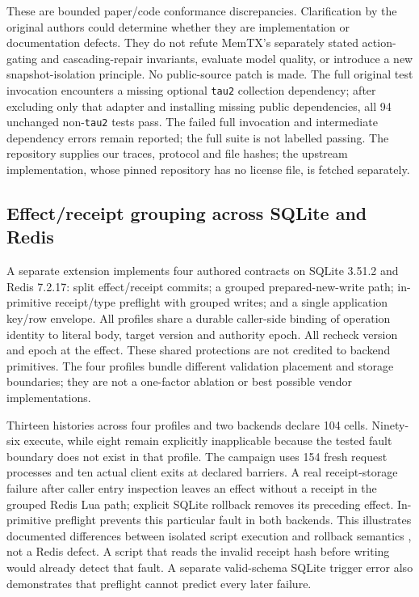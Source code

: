 These are bounded paper/code conformance discrepancies. Clarification by the original authors could determine whether they are implementation or documentation defects. They do not refute MemTX's separately stated action-gating and cascading-repair invariants, evaluate model quality, or introduce a new snapshot-isolation principle. No public-source patch is made. The full original test invocation encounters a missing optional \texttt{tau2} collection dependency; after excluding only that adapter and installing missing public dependencies, all 94 unchanged non-\texttt{tau2} tests pass. The failed full invocation and intermediate dependency errors remain reported; the full suite is not labelled passing. The repository supplies our traces, protocol and file hashes; the upstream implementation, whose pinned repository has no license file, is fetched separately.

\subsection{Effect/receipt grouping across SQLite and Redis}
A separate extension implements four authored contracts on SQLite 3.51.2 and Redis 7.2.17: split effect/receipt commits; a grouped prepared-new-write path; in-primitive receipt/type preflight with grouped writes; and a single application key/row envelope. All profiles share a durable caller-side binding of operation identity to literal body, target version and authority epoch. All recheck version and epoch at the effect. These shared protections are not credited to backend primitives. The four profiles bundle different validation placement and storage boundaries; they are not a one-factor ablation or best possible vendor implementations.

Thirteen histories across four profiles and two backends declare 104 cells. Ninety-six execute, while eight remain explicitly inapplicable because the tested fault boundary does not exist in that profile. The campaign uses 154 fresh request processes and ten actual client exits at declared barriers. A real receipt-storage failure after caller entry inspection leaves an effect without a receipt in the grouped Redis Lua path; explicit SQLite rollback removes its preceding effect. In-primitive preflight prevents this particular fault in both backends. This illustrates documented differences between isolated script execution and rollback semantics \cite{redis2026eval,redis2026transactions,sqlite2026transactions}, not a Redis defect. A script that reads the invalid receipt hash before writing would already detect that fault. A separate valid-schema SQLite trigger error also demonstrates that preflight cannot predict every later failure.

